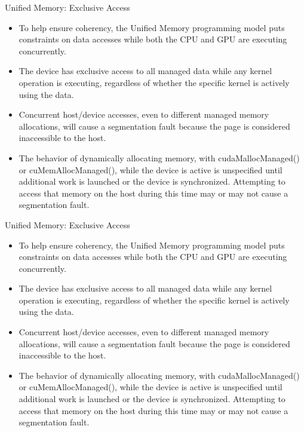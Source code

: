 \documentclass{beamer}
\begin{document}
\begin{frame}{Unified Memory: Exclusive Access}
\begin{itemize}
    \item<1->To help ensure coherency, the Unified Memory programming model puts constraints on data accesses while both the CPU and GPU are executing concurrently.
    \item<1->The device has exclusive access to all managed data while any kernel operation is executing, regardless of whether the specific kernel is actively using the data.
    \item<1->Concurrent host/device accesses, even to different managed memory allocations, will cause a segmentation fault because the page is considered inaccessible to the host.
    \item<1->The behavior of dynamically allocating memory, with {\selectfont cudaMallocManaged()} or {\selectfont cuMemAllocManaged()}, while the device is active is unspecified until additional work is launched or the device is synchronized.  Attempting to access that memory on the host during this time may or may not cause a segmentation fault.
\end{itemize}
\end{frame}

\begin{frame}{Unified Memory: Exclusive Access}
\begin{itemize}
    \item<1->To help ensure coherency, the Unified Memory programming model puts constraints on data accesses while both the CPU and GPU are executing concurrently.
    \item<1->The device has exclusive access to all managed data while any kernel operation is executing, regardless of whether the specific kernel is actively using the data.
    \item<1->Concurrent host/device accesses, even to different managed memory allocations, will cause a segmentation fault because the page is considered inaccessible to the host.
    \item<1->The behavior of dynamically allocating memory, with {\selectfont cudaMallocManaged()} or {\selectfont cuMemAllocManaged()}, while the device is active is unspecified until additional work is launched or the device is synchronized.  Attempting to access that memory on the host during this time may or may not cause a segmentation fault.
\end{itemize}
\end{frame}
\end{document}

